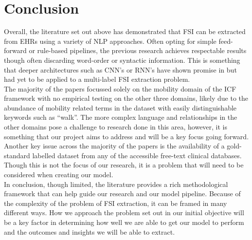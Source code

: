 \section{Conclusion}

Overall, the literature set out above has demonstrated that FSI can be extracted from EHRs using a variety of NLP approaches. Often opting for simple feed-forward or rule-based pipelines, the previous research achieves respectable results though often discarding word-order or syntactic information. This is something that deeper architectures such as CNN’s or RNN’s have shown promise in but had yet to be applied to a multi-label FSI extraction problem. \\

The majority of the papers focussed solely on the mobility domain of the ICF framework with no empirical testing on the other three domains, likely due to the abundance of mobility related terms in the dataset with easily distinguishable keywords such as “walk”. The more complex language and relationships in the other domains pose a challenge to research done in this area, however, it is something that our project aims to address and will be a key focus going forward. \\

Another key issue across the majority of the papers is the availability of a gold-standard labelled dataset from any of the accessible free-text clinical databases. Though this is not the focus of our research, it is a problem that will need to be considered when creating our model. \\

In conclusion, though limited, the literature provides a rich methodological framework that can help guide our research and our model pipeline. Because of the complexity of the problem of FSI extraction, it can be framed in many different ways. How we approach the problem set out in our initial objective will be a key factor in determining how well we are able to get our model to perform and the outcomes and insights we will be able to extract.
